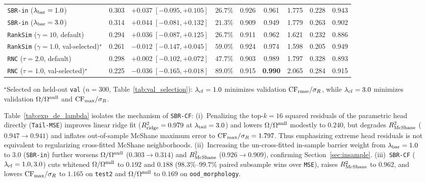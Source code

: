\documentclass[preprint,11pt,a4paper]{elsarticle}
\begin{document}
\begin{table}[ht!]
{\begin{tabular}{lcccccccc}
\texttt{SBR-in} ($\lambda_{\rm bar}=1.0$) & 0.303 & $+0.037\;[-0.095,+0.105]$ & $26.7\%$ & 0.926 & 0.961 & 1.775 & 0.228 & 0.943 \\
\texttt{SBR-in} ($\lambda_{\rm bar}=3.0$) & 0.314 & $+0.044\;[-0.081,+0.132]$ & $21.3\%$ & 0.909 & 0.949 & 1.779 & 0.263 & 0.902 \\
\midrule
\texttt{RankSim} ($\gamma=10$, default) & 0.294 & $+0.036\;[-0.087,+0.125]$ & $26.7\%$ & 0.911 & 0.962 & 1.621 & 0.232 & 0.886 \\
\texttt{RankSim} ($\gamma=1.0$, val-selected)$^\star$ & 0.261 & $-0.012\;[-0.147,+0.045]$ & $59.0\%$ & 0.924 & 0.974 & 1.598 & 0.205 & 0.949 \\
\texttt{RNC} ($\tau=2.0$, default) & 0.298 & $+0.002\;[-0.102,+0.072]$ & $47.7\%$ & 0.903 & 0.989 & 1.797 & 0.328 & 0.893 \\
\texttt{RNC} ($\tau=1.0$, val-selected)$^\star$ & 0.225 & $-0.036\;[-0.165,+0.018]$ & $89.0\%$ & 0.915 & \textbf{0.990} & 2.065 & 0.284 & 0.915 \\
\bottomrule
\end{tabular}%
}
\par\smallskip\raggedright{\footnotesize $^\star$Selected on held-out \texttt{val} ($n=300$, Table~\ref{tab:val_selection}): $\lambda_{\rm cf}=1.0$ minimizes validation ${\rm CF}_{\rm rmse}/\sigma_R$, while $\lambda_{\rm cf}=3.0$ minimizes validation $\Omega/\Omega^{\rm null}$ and ${\rm CF}_{\max}/\sigma_R$.}
\end{table}

Table~\ref{tab:exp_de_lambda} isolates the mechanism of \texttt{SBR-CF}:
(i)~Penalizing the top-$k=16$ squared residuals of the parametric head directly (\texttt{Tail-MSE}) improves linear ridge fit ($R^2_{\rm ridge}=0.979$ at $\lambda_{\rm tail}=3.0$) and lowers $\Omega/\Omega^{\rm null}$ modestly to $0.240$, but degrades $R^2_{\rm McShane}$ ($0.947\to 0.941$) and inflates out-of-sample McShane maximum error to ${\rm CF}_{\max}/\sigma_R=1.797$. Thus emphasizing extreme head residuals is not equivalent to regularizing cross-fitted McShane neighborhoods.
(ii)~Increasing the un-cross-fitted in-sample barrier weight from $\lambda_{\rm bar}=1.0$ to $3.0$ (\texttt{SBR-in}) further worsens $\Omega/\Omega^{\rm null}$ ($0.303\to 0.314$) and $R^2_{\rm McShane}$ ($0.926\to 0.909$), confirming Section~\ref{sec:insample}.
(iii)~\texttt{SBR-CF} ($\lambda_{\rm cf}=1.0, 3.0$) cuts whitened $\Omega/\Omega^{\rm null}$ to $\mathbf{0.192}$ and $\mathbf{0.188}$ ($98.3\%\text{--}99.7\%$ paired subsample wins over \texttt{MSE}), raises $R^2_{\rm McShane}$ to $\mathbf{0.962}$, and lowers ${\rm CF}_{\max}/\sigma_R$ to $\mathbf{1.165}$ on \texttt{test2} and $\Omega/\Omega^{\rm null}$ to $\mathbf{0.169}$ on \texttt{ood\_morphology}.
\end{document}
